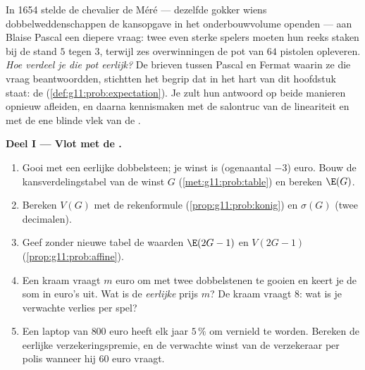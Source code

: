 \begin{problem}
\label{pb:g11:prob:1}
In 1654 stelde de chevalier de Méré --- dezelfde gokker wiens
dobbelweddenschappen de kansopgave in het onderbouwvolume openden --- aan
Blaise Pascal een diepere vraag: twee even sterke spelers moeten hun reeks
staken bij de stand $5$ tegen $3$, terwijl zes overwinningen de pot van $64$
pistolen opleveren. \emph{Hoe verdeel je die pot eerlijk?} De brieven tussen
Pascal en Fermat waarin ze die vraag beantwoordden, stichtten het begrip dat
in het hart van dit hoofdstuk staat: de 
(\cref{def:g11:prob:expectation}). Je zult hun antwoord op beide manieren
opnieuw afleiden, en daarna kennismaken met de salontruc van de lineariteit
en met de ene blinde vlek van de .

\medskip
\noindent\textbf{Deel I --- Vlot met de .}
\begin{enumerate}
  \item Gooi met een eerlijke dobbelsteen; je winst is (ogenaantal $- 3$)
        euro. Bouw de kansverdelingstabel van de winst $G$
        (\cref{met:g11:prob:table}) en bereken $\E(G)$.
  \item Bereken $V(G)$ met de rekenformule (\cref{prop:g11:prob:konig}) en
        $\sigma(G)$ (twee decimalen).
  \item Geef zonder nieuwe tabel de waarden $\E(2G - 1)$ en $V(2G - 1)$
        (\cref{prop:g11:prob:affine}).
  \item Een kraam vraagt $m$ euro om met twee dobbelstenen te gooien en keert
        je de som in euro's uit. Wat is de \emph{eerlijke} prijs $m$? De
        kraam vraagt $8$: wat is je verwachte verlies per spel?
  \item Een laptop van $800$ euro heeft elk jaar $5\,\%$  om vernield te
        worden. Bereken de eerlijke verzekeringspremie, en de verwachte winst
        van de verzekeraar per polis wanneer hij $60$ euro vraagt.
\end{enumerate}


\end{problem}
